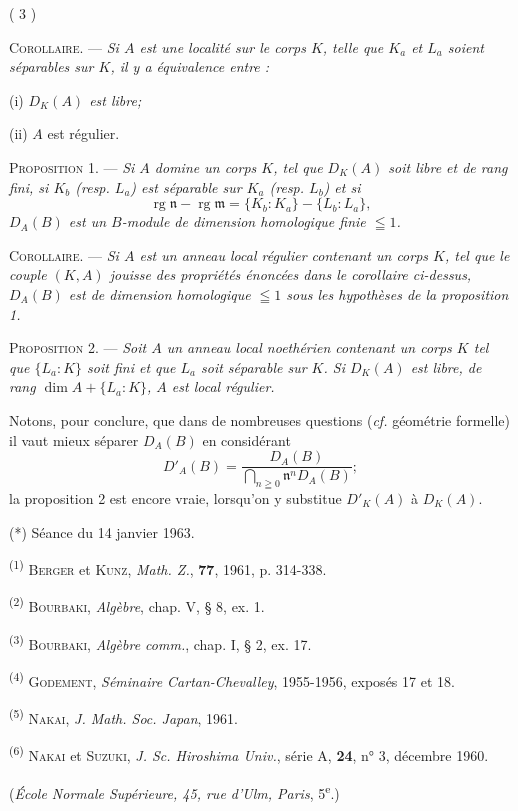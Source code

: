 \begin{center}( 3 )\end{center}

\textsc{Corollaire.} --- \textit{Si $A$ est une localité sur le corps $K$, telle que $K_a$ et $L_a$ soient séparables sur $K$, il y a équivalence entre :}

(i) \textit{$D_K(A)$ est libre;}

(ii) $A$ est régulier.

\textsc{Proposition 1.} --- \textit{Si $A$ domine un corps $K$, tel que $D_K(A)$ soit libre et de rang fini, si $K_b$ (resp. $L_a$) est séparable sur $K_a$ (resp. $L_b$) et si}
\[
\operatorname{rg}\mathfrak n-\operatorname{rg}\mathfrak m=\{K_b:K_a\}-\{L_b:L_a\},
\]
\textit{$D_A(B)$ est un $B$-module de dimension homologique finie $\leqq1$.}

\textsc{Corollaire.} --- \textit{Si $A$ est un anneau local régulier contenant un corps $K$, tel que le couple $(K,A)$ jouisse des propriétés énoncées dans le corollaire ci-dessus, $D_A(B)$ est de dimension homologique $\leqq1$ sous les hypothèses de la proposition 1.}

\textsc{Proposition 2.} --- \textit{Soit $A$ un anneau local noethérien contenant un corps $K$ tel que $\{L_a:K\}$ soit fini et que $L_a$ soit séparable sur $K$. Si $D_K(A)$ est libre, de rang $\dim A+\{L_a:K\}$, $A$ est local régulier.}

Notons, pour conclure, que dans de nombreuses questions (\textit{cf.} géométrie formelle) il vaut mieux séparer $D_A(B)$ en considérant
\[
D'_A(B)=\frac{D_A(B)}{\displaystyle\bigcap_{n\geqq0}\mathfrak n^n D_A(B)};
\]
la proposition 2 est encore vraie, lorsqu'on y substitue $D'_K(A)$ à $D_K(A)$.

(*) Séance du 14 janvier 1963.

\textsuperscript{(1)} \textsc{Berger} et \textsc{Kunz}, \textit{Math. Z.}, \textbf{77}, 1961, p. 314-338.

\textsuperscript{(2)} \textsc{Bourbaki}, \textit{Algèbre}, chap. V, § 8, ex. 1.

\textsuperscript{(3)} \textsc{Bourbaki}, \textit{Algèbre comm.}, chap. I, § 2, ex. 17.

\textsuperscript{(4)} \textsc{Godement}, \textit{Séminaire Cartan-Chevalley}, 1955-1956, exposés 17 et 18.

\textsuperscript{(5)} \textsc{Nakai}, \textit{J. Math. Soc. Japan}, 1961.

\textsuperscript{(6)} \textsc{Nakai} et \textsc{Suzuki}, \textit{J. Sc. Hiroshima Univ.}, série A, \textbf{24}, n° 3, décembre 1960.

\hfill (\textit{École Normale Supérieure, 45, rue d'Ulm, Paris}, 5\textsuperscript{e}.)

